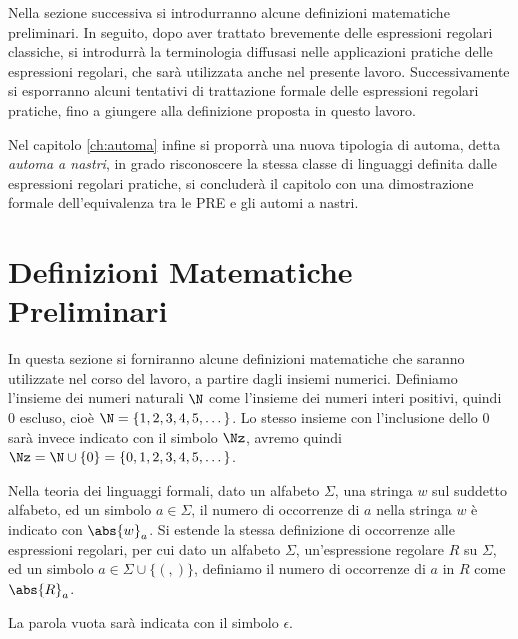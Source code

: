 Nella sezione successiva si introdurranno alcune definizioni matematiche preliminari. In seguito, dopo aver trattato brevemente delle espressioni regolari classiche, si introdurrà la terminologia diffusasi nelle applicazioni pratiche delle espressioni regolari, che sarà utilizzata anche nel presente lavoro. Successivamente si esporranno alcuni tentativi di trattazione formale delle espressioni regolari pratiche, fino a giungere alla definizione proposta in questo lavoro.

Nel capitolo \ref{ch:automa} infine si proporrà una nuova tipologia di automa, detta \textit{automa a nastri}, in grado risconoscere la stessa classe di linguaggi definita dalle espressioni regolari pratiche, si concluderà il capitolo con una dimostrazione formale dell'equivalenza tra le PRE e gli automi a nastri.


\section{Definizioni Matematiche Preliminari}

In questa sezione si forniranno alcune definizioni matematiche che saranno utilizzate nel corso del lavoro, a partire dagli insiemi numerici. Definiamo l'insieme dei numeri naturali $\N$ come l'insieme dei numeri interi positivi, quindi $0$ escluso, cioè $\N = \{1, 2, 3, 4, 5, \dots\}$. Lo stesso insieme con l'inclusione dello $0$ sarà invece indicato con il simbolo $\Nz$, avremo quindi $\Nz = \N \cup \{0\} = \{0, 1, 2, 3, 4, 5, \dots\}$.

Nella teoria dei linguaggi formali, dato un alfabeto $\Sigma$, una stringa $w$ sul suddetto alfabeto, ed un simbolo $a \in \Sigma$, il numero di occorrenze di $a$ nella stringa $w$ è indicato con $\abs{w}_a$. Si estende la stessa definizione di occorrenze alle espressioni regolari, per cui dato un alfabeto $\Sigma$, un'espressione regolare $R$ su $\Sigma$, ed un simbolo $a \in \Sigma \cup \{(, )\}$, definiamo il numero di occorrenze di $a$ in $R$ come $\abs{R}_a$.

La parola vuota sarà indicata con il simbolo $\epsilon$.
